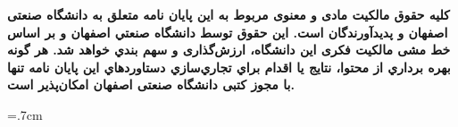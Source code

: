 {\large
	\doublespacing
		\textbf{
		کلیه حقوق مالکیت مادی و معنوی مربوط به اين پايان نامه متعلق به دانشگاه صنعتی اصفهان و پدیدآورندگان است. این حقوق توسط دانشگاه صنعتي اصفهان و بر اساس خط مشی مالکیت فکری این دانشگاه، ارزش‌گذاری و سهم بندي خواهد شد. هر گونه بهره برداري از محتوا، نتايج یا اقدام براي تجاري‌سازي دستاوردهاي اين پايان نامه تنها با مجوز کتبی دانشگاه صنعتی اصفهان امکان‌پذیر است.
		}\\
	}
\restoregeometry
\pagebreak



\baselineskip=.7cm

\tableofcontents
\pagebreak



\titlespacing*{\chapter}{0pt}{3.5cm}{6cm}

